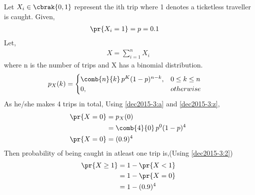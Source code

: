 Let $X_i\in\cbrak{0,1}$ represent the ith trip where 1 denotes a ticketless traveller is caught.
Given,
\begin{align}
     \pr{X_i=1}&=p=0.1 \label{dec2015-3:a}
\end{align}
Let,
\begin{align}
    X=\sum_{i=1}^n X_i
\end{align}
where n is the number of trips and X has a binomial distribution.
\begin{align}
    p_X(k)&=
    \begin{cases}
     \comb{n}{k}\,p^K(1-p)^{n-k}, & 0\le k\le n
     \\
    0, & otherwise
    \end{cases}\label{dec2015-3:z}
\end{align}
As he/she makes 4 trips in total, Using \eqref{dec2015-3:a} and
\eqref{dec2015-3:z},
\begin{align}
    \pr{X=0}&=p_X(0)\\
    &=\comb{4}{0}\,p^0(1-p)^4\\
    \pr{X=0}&=(0.9)^4\label{dec2015-3:2}
\end{align}
Then probability of being caught in atleast one trip is,(Using \eqref{dec2015-3:2})
\begin{align}
    \pr{X\ge1}&=1-\pr{X<1}\\
    &=1-\pr{X=0}\label{dec2015-3:1}\\
    &=1-(0.9)^4
\end{align}